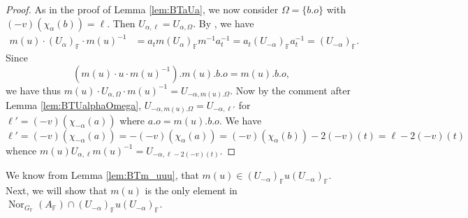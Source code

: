 \documentclass[12pt]{amsart}
\newcommand{\F}{\mathbb{F} }
\numberwithin{equation}{section}
\theoremstyle{remark} %
\begin{document}
\begin{proof}
			As in the proof of Lemma \ref{lem:BTaUa}, we now consider $\Omega = \{b.o\}$ with $(-v)(\chi_\alpha(b)) = \ell$. Then $U_{\alpha,\ell} = U_{\alpha,\Omega}$. By \cite[Lemma \ref{I-lem:Jacobson_Morozov_m} and \ref{I-lem:aexpXa}]{AppAGRCF}, we have
			\begin{align*}
				m(u)\cdot (U_\alpha)_\F \cdot m(u)^{-1} & = a_t  m  (U_\alpha)_\F  m^{-1}  a_t^{-1} = a_t (U_{-\alpha})_\F a_t^{-1} = (U_{-\alpha})_\F.
			\end{align*}
			Since 
			$$	
			(m(u)\cdot u \cdot m(u)^{-1}).m(u).b.o = m(u).b.o,
			$$
			we have thus $m(u) \cdot U_{\alpha, \Omega} \cdot m(u)^{-1} = U_{-\alpha, m(u).\Omega}$. 
			Now by the comment after Lemma \ref{lem:BTUalphaOmega}, $U_{-\alpha, m(u).\Omega} = U_{-\alpha, \ell'}$ for $\ell' = (-v)(\chi_{-\alpha}(a))$ where $a.o = m(u).b.o$. We have
			$$
			\ell' = (-v)(\chi_{-\alpha}(a)) = -(-v)(\chi_\alpha(a)) = (-v)(\chi_\alpha(b)) - 2(-v)(t) = \ell -2(-v)(t)
			$$
			whence $m(u)U_{\alpha,\ell}m(u)^{-1} = U_{-\alpha,\ell-2(-v)(t)}$.
		\end{proof}
		
		We know from Lemma \ref{lem:BTm_uuu}, that $m(u)\in (U_{-\alpha})_\F u (U_{-\alpha})_\F$. Next, we will show that $m(u)$ is the only element in $\operatorname{Nor}_{G_\F}(A_\F) \cap  (U_{-\alpha})_\F u (U_{-\alpha})_\F$.
		
\end{document}
